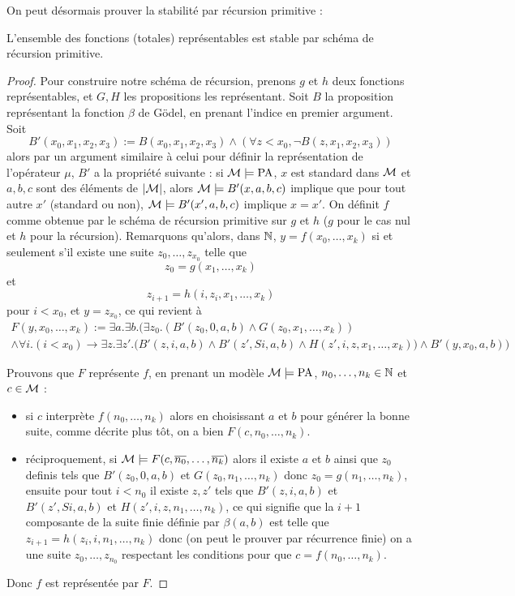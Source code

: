 On peut désormais prouver la stabilité par récursion primitive :

\begin{lem}
    L'ensemble des fonctions (totales) représentables est stable par schéma de récursion primitive.
\end{lem}

\begin{proof}
    Pour construire notre schéma de récursion, prenons $g$ et $h$ deux fonctions représentables, et $G,H$ les propositions les représentant. Soit $B$ la proposition représentant la fonction $\beta$ de Gödel, en prenant l'indice en premier argument. Soit $$B'(x_0,x_1,x_2,x_3) := B(x_0,x_1,x_2,x_3)\land (\forall z < x_0, \lnot B(z,x_1,x_2,x_3))$$ alors par un argument similaire à celui pour définir la représentation de l'opérateur $\mu$, $B'$ a la propriété suivante : si $\mathcal M\models \mathrm{PA}$, $x$ est standard dans $\mathcal M$ et $a,b,c$ sont des éléments de $|\mathcal M|$, alors $\mathcal M\models B'(x,a,b,c)$ implique que pour tout autre $x'$ (standard ou non), $\mathcal M\models B'(x',a,b,c)$ implique $x=x'$. On définit $f$ comme obtenue par le schéma de récursion primitive sur $g$ et $h$ ($g$ pour le cas nul et $h$ pour la récursion). Remarquons qu'alors, dans $\mathbb{N}$, $y=f(x_0,\ldots,x_k)$ si et seulement s'il existe une suite $z_0,\ldots,z_{x_0}$ telle que $$z_0 = g(x_1,\ldots,x_k)$$ et $$z_{i+1} = h(i,z_i,x_1,\ldots,x_k)$$ pour $i<x_0$, et $y=z_{x_0}$, ce qui revient à \begin{multline*}
        F(y,x_0,\ldots,x_k) := \exists a.\exists b. \Bigg( \exists z_0. (B'(z_0,0,a,b)\land G(z_0,x_1,\ldots,x_k)) \\ 
        \land \forall i. (i<x_0) \to \exists z.\exists z'. \big( B'(z,i,a,b)\land B'(z',Si,a,b)\land H(z',i,z,x_1,\ldots,x_k) \big) \land B'(y,x_0,a,b)
        \Bigg)
    \end{multline*}

    Prouvons que $F$ représente $f$, en prenant un modèle $\mathcal M\models \mathrm{PA}$, $n_0,\ldots,n_k\in\mathbb{N}$ et $c\in\mathcal M$ :
    \begin{itemize}[label=$\bullet$]
        \item si $c$ interprète $f(n_0,\ldots,n_k)$ alors en choisissant $a$ et $b$ pour générer la bonne suite, comme décrite plus tôt, on a bien $F(c,n_0,\ldots,n_k)$.
        \item réciproquement, si $\mathcal M\models F(c,\overline{n_0},\ldots,\overline{n_k})$ alors il existe $a$ et $b$ ainsi que $z_0$ definis tels que $B'(z_0,0,a,b)$ et $G(z_0,n_1,\ldots,n_k)$ donc $z_0=g(n_1,\ldots,n_k)$, ensuite pour tout $i < n_0$ il existe $z,z'$ tels que $B'(z,i,a,b)$ et $B'(z',Si,a,b)$ et $H(z',i,z,n_1,\ldots,n_k)$, ce qui signifie que la $i+1$\ieme{} composante de la suite finie définie par $\beta(a,b)$ est telle que $z_{i+1}=h(z_i,i,n_1,\ldots,n_k)$ donc (on peut le prouver par récurrence finie) on a une suite $z_0,\ldots,z_{n_0}$ respectant les conditions pour que $c=f(n_0,\ldots,n_k)$.
    \end{itemize}

    Donc $f$ est représentée par $F$.
\end{proof}


